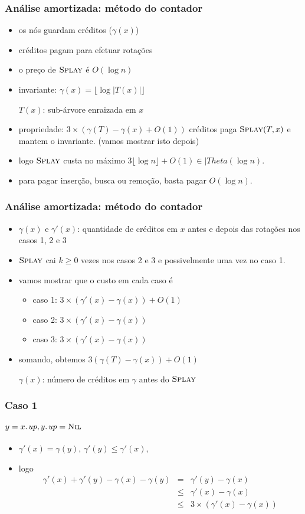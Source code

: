 \documentclass{beamer}
\begin{document}
\begin{frame}
\frametitle{Análise amortizada: método do contador}
\begin{itemize}
\item os nós guardam créditos ($\gamma(x)$)
\item créditos pagam para efetuar rotações
\item o preço de $\textnormal{\scshape Splay}$ é $O(\log n)$
\item invariante: $\gamma(x) = \lfloor \log | T(x) | \rfloor$

  $T(x)$: sub-árvore enraizada em $x$

\item propriedade: $3 \times (\gamma(T) - \gamma(x) + O(1))$ créditos paga $\textnormal{\scshape Splay}(T, x)$ e mantem o invariante. (\alert{vamos mostrar isto depois})
\item logo $\textnormal{\scshape Splay}$ custa no máximo $3 \lfloor \log n \rfloor + O(1) \in |Theta(\log n)$.
\item para pagar inserção, busca ou remoção, basta pagar $O(\log n)$.
\end{itemize}
\end{frame}

\begin{frame}
\frametitle{Análise amortizada: método do contador}
\begin{itemize}
\item $\gamma(x)$ e $\gamma'(x)$: quantidade de créditos em $x$ antes
e depois das rotações nos casos 1, 2 e 3
\item $\textnormal{\scshape Splay}$ cai $k \ge 0$ vezes nos casos 2 e 3 e
  possivelmente uma vez no caso 1.
\item vamos mostrar que o custo em cada caso é
\begin{itemize}
\item caso 1: $3 \times(\gamma'(x) - \gamma(x)) + O(1)$
\item caso 2: $3 \times(\gamma'(x) - \gamma(x))$
\item caso 3: $3 \times(\gamma'(x) - \gamma(x))$
\end{itemize}
\item somando, obtemos $3(\gamma(T) - \gamma(x)) + O(1)$

$\gamma(x)$: número de créditos em $\gamma$ antes do $\textnormal{\scshape Splay}$
\end{itemize}
\end{frame}

\begin{frame}
\frametitle{Caso 1}
\framesubtitle{$y = \attrib{x}{up}, \attrib{y}{up} = \const{Nil}$}

\begin{itemize}
\item $\gamma'(x) = \gamma(y)$, $\gamma'(y) \le \gamma'(x)$,
\item logo 
\begin{eqnarray*}
\gamma'(x) + \gamma'(y) - \gamma(x) - \gamma(y) & = & \gamma'(y) - \gamma(x) \\
& \le & \gamma'(x) - \gamma(x) \\
& \le & 3 \times(\gamma'(x) - \gamma(x))
\end{eqnarray*}
\end{itemize}
\end{frame}
\end{document}
